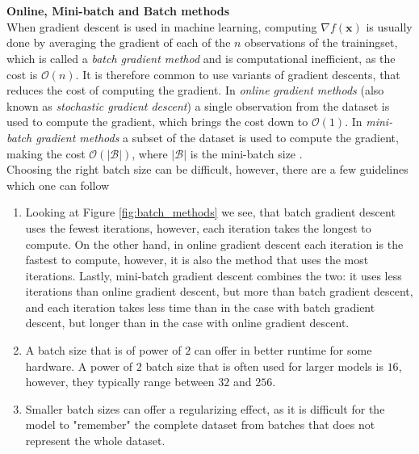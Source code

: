 \documentclass[./main.tex]{subfiles}
\begin{document}
\\
\\
\noindent \textbf{Online, Mini-batch and Batch methods} \\
\noindent When gradient descent is used in machine learning, computing $\nabla f(\bm{x})$ is usually done by averaging the gradient of each of the $n$ observations of the trainingset, which is called a \textit{batch gradient method} and is computational inefficient, as the cost is $\mathcal{O}(n)$. It is therefore common to use variants of gradient descents, that reduces the cost of computing the gradient. In \textit{online gradient methods} (also known as \textit{stochastic gradient descent}) a single observation from the dataset is used to compute the gradient, which brings the cost down to $\mathcal{O}(1)$. In \textit{mini-batch gradient methods} a subset of the dataset is used to compute the gradient, making the cost $\mathcal{O}(|\mathcal{B}|)$, where $|\mathcal{B}|$ is the mini-batch size \cite{d2l}. \\
Choosing the right batch size can be difficult, however, there are a few guidelines which one can follow \cite{EML_optimization} \cite{d2l}
\begin{enumerate}
    \item Looking at Figure \ref{fig:batch_methods} we see, that batch gradient descent uses the fewest iterations, however, each iteration takes the longest to compute. On the other hand, in online gradient descent each iteration is the fastest to compute, however, it is also the method that uses the most iterations. Lastly, mini-batch gradient descent combines the two: it uses less iterations than online gradient descent, but more than batch gradient descent, and each iteration takes less time than in the case with batch gradient descent, but longer than in the case with online gradient descent.
    \item A batch size that is of power of $2$ can offer in better runtime for some hardware. A power of $2$ batch size that is often used for larger models is $16$, however, they typically range between $32$ and $256$.
    \item Smaller batch sizes can offer a regularizing effect, as it is difficult for the model to "remember" the complete dataset from batches that does not represent the whole dataset.
\end{enumerate}
\end{document}
